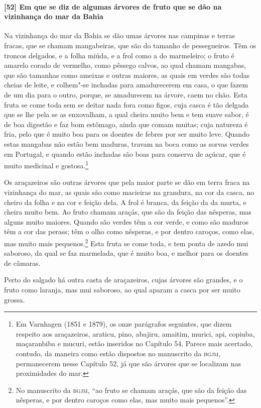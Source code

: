 \paragraph{[52] Em que se diz de algumas árvores de fruto que se dão na vizinhança do mar da
Bahia}\quad
Na vizinhança do mar da Bahia se dão umas árvores nas campinas e terras fracas, que se
chamam mangabeiras, que são do tamanho de pessegueiros. Têm os troncos delgados, e a folha
miúda, e a frol como a do marmeleiro; o fruto é amarelo corado de vermelho, como pêssego
calvos, ao qual chamam mangabas, que são tamanhas como ameixas e outras maiores, as quais
em verdes são todas cheias de leite, e colhem"-se inchadas para amadurecerem em casa, o que
fazem de um dia para o outro, porque, se amadurecem na árvore, caem no chão. Esta fruta se
come toda sem se deitar nada fora como figos, cuja casca é tão delgada que se lhe pela se
as enxovalham, a qual cheira muito bem e tem suave sabor, é de boa digestão e faz bom
estômago, ainda que comam muitas; cuja natureza é fria, pelo que é muito boa para os
doentes de febres por ser muito leve. Quando estas mangabas não estão bem maduras, travam
na boca como as sorvas verdes em Portugal, e quando estão inchadas são boas para conserva
de açúcar, que é muito medicinal e gostosa.\footnote{ Em Varnhagen (1851 e 1879), os onze
parágrafos seguintes, que dizem respeito aos araçazeiros, araticu, pino, abajiru, amaitim,
murici, api, copiuba, maçaranbiba e mucuri, estão inseridos no Capítulo 54. Parece mais
acertado, contudo, da maneira como estão dispostos no manuscrito da \textsc{bgjm},
permanecerem nesse Capítulo 52, já que são árvores que se localizam nas proximidades do
mar.}

Os araçazeiros são outras árvores que pela maior parte se dão em terra fraca na vizinhança
do mar, as quais são como macieiras na grandura, na cor da casca, no cheiro da folha e na
cor e feição dela. A frol é branca, da feição da da murta, e cheira muito bem. Ao fruto
chamam araçás, que são da feição das nêsperas, mas alguns muito maiores. Quando são verdes
têm a cor verde, e como são maduros têm a cor das perass; têm o olho como nêsperas, e por
dentro caroços, como elas, mas muito mais pequenos.\footnote{ No manuscrito da
\textsc{bgjm}, ``ao fruto se chamam araçás, que são da feição das nêsperas, e por dentro
caroços como elas, mas muito mais pequenos''.} Esta fruta se come toda, e tem ponta de
azedo mui saboroso, da qual se faz marmelada, que é muito boa, e melhor para os doentes de
câmaras.


Perto do salgado há outra casta de araçazeiros, cujas árvores são grandes, e o fruto como
laranja, mas mui saboroso, ao qual aparam a casca por ser muito grossa.

